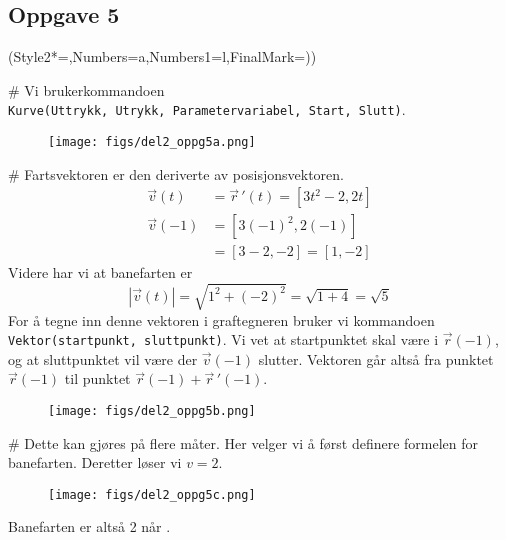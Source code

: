 \subsection*{Oppgave 5}

\begin{easylist}[enumerate]
	\ListProperties(Style2*=,Numbers=a,Numbers1=l,FinalMark={)})
	
	# Vi brukerkommandoen \\
	\verb|Kurve(Uttrykk, Utrykk, Parametervariabel, Start, Slutt)|.
	\begin{figure}[ht!]
		\centering
		\texttt{[image: figs/del2\_oppg5a.png]}
	\end{figure}
	
	# Fartsvektoren er den deriverte av posisjonsvektoren.
	\begin{align*}
			\vec{v}(t) & = \vec{r} \, '(t)  = [3t^2 -2, 2t] \\
			\vec{v}(-1) & = [3(-1)^2,2(-1)] \\
			& = [3-2,-2] = [1,-2] 
	\end{align*}
	Videre har vi at banefarten er 
	\begin{equation*}
		|\vec{v}(t)| = \sqrt{1^2 + (-2)^2} = \sqrt{1 + 4} = \sqrt{5}
	\end{equation*}
	For å tegne inn denne vektoren i graftegneren bruker vi kommandoen \\ \verb|Vektor(startpunkt, sluttpunkt)|. 
	Vi vet at startpunktet skal være i $\vec{r}(-1)$, og at sluttpunktet vil være der $\vec{v}(-1)$ slutter.
	Vektoren går altså fra punktet $\vec{r}(-1)$ til punktet $\vec{r}(-1) + \vec{r}\, '(-1)$.

	\begin{figure}[ht!]
		\centering
		\texttt{[image: figs/del2\_oppg5b.png]}
	\end{figure}
	
	# Dette kan gjøres på flere måter. 
	Her velger vi å først definere formelen for banefarten. 
	Deretter løser vi $v = 2$. 
		\begin{figure}[ht!]
			\centering
			\texttt{[image: figs/del2\_oppg5c.png]}
		\end{figure}
		
	Banefarten er altså 2 når .
		

\end{easylist}
